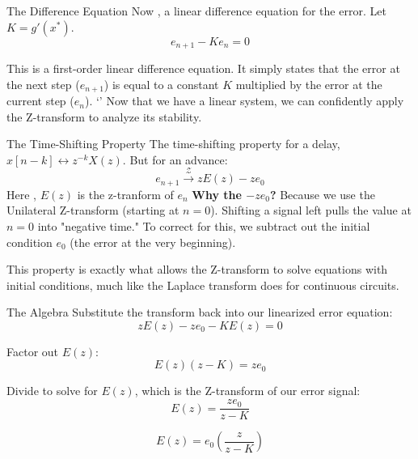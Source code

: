\documentclass{beamer}
\begin{document}
\begin{frame}{The Difference Equation}
    Now , a linear difference equation for the error. Let $K = g'(x^*)$.
    $$e_{n+1} - K e_n = 0$$
    
    This is a first-order linear difference equation. It simply states that the error at the next step ($e_{n+1}$) is equal to a constant $K$ multiplied by the error at the current step ($e_n$).
    `'
    \vspace{0.3cm}
    Now that we have a linear system, we can confidently apply the Z-transform to analyze its stability.
\end{frame}

\begin{frame}{The Time-Shifting Property}
    The time-shifting property  for a delay, $x[n-k] \leftrightarrow z^{-k} X(z)$. But for an advance:
    $$e_{n+1} \xrightarrow{\mathcal{Z}} zE(z) - ze_0$$
    Here , $E(z)$ is the z-tranform of $e_n$ 
    \vspace{0.05cm}
    \textbf{Why the $- ze_0$?}
    Because we use the Unilateral Z-transform (starting at $n=0$). Shifting a signal left pulls the value at $n=0$ into "negative time." To correct for this, we subtract out the initial condition $e_0$ (the error at the very beginning). 
    
    \vspace{0.2cm}
    This property is exactly what allows the Z-transform to solve equations with initial conditions, much like the Laplace transform does for continuous circuits.
\end{frame}

\begin{frame}{The Algebra}
    Substitute the transform back into our linearized error equation:
    $$zE(z) - ze_0 - KE(z) = 0$$
    
    Factor out $E(z)$:
    $$E(z)(z - K) = ze_0$$
    
    Divide to solve for $E(z)$, which is the Z-transform of our error signal:
    $$E(z) = \frac{z e_0}{z - K}$$
    
    $$E(z) = e_0 \left( \frac{z}{z - K} \right)$$
\end{frame}
\end{document}
